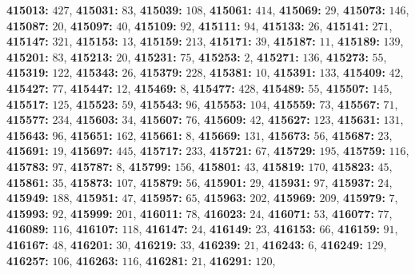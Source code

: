 \textsf{\bfseries 415013:} $427$, \textsf{\bfseries 415031:} $83$, \textsf{\bfseries 415039:} $108$, \textsf{\bfseries 415061:} $414$, \textsf{\bfseries 415069:} $29$, \textsf{\bfseries 415073:} $146$, \textsf{\bfseries 415087:} $20$, \textsf{\bfseries 415097:} $40$, \textsf{\bfseries 415109:} $92$, \textsf{\bfseries 415111:} $94$, \textsf{\bfseries 415133:} $26$, \textsf{\bfseries 415141:} $271$, \textsf{\bfseries 415147:} $321$, \textsf{\bfseries 415153:} $13$, \textsf{\bfseries 415159:} $213$, \textsf{\bfseries 415171:} $39$, \textsf{\bfseries 415187:} $11$, \textsf{\bfseries 415189:} $139$, \textsf{\bfseries 415201:} $83$, \textsf{\bfseries 415213:} $20$, \textsf{\bfseries 415231:} $75$, \textsf{\bfseries 415253:} $2$, \textsf{\bfseries 415271:} $136$, \textsf{\bfseries 415273:} $55$, \textsf{\bfseries 415319:} $122$, \textsf{\bfseries 415343:} $26$, \textsf{\bfseries 415379:} $228$, \textsf{\bfseries 415381:} $10$, \textsf{\bfseries 415391:} $133$, \textsf{\bfseries 415409:} $42$, \textsf{\bfseries 415427:} $77$, \textsf{\bfseries 415447:} $12$, \textsf{\bfseries 415469:} $8$, \textsf{\bfseries 415477:} $428$, \textsf{\bfseries 415489:} $55$, \textsf{\bfseries 415507:} $145$, \textsf{\bfseries 415517:} $125$, \textsf{\bfseries 415523:} $59$, \textsf{\bfseries 415543:} $96$, \textsf{\bfseries 415553:} $104$, \textsf{\bfseries 415559:} $73$, \textsf{\bfseries 415567:} $71$, \textsf{\bfseries 415577:} $234$, \textsf{\bfseries 415603:} $34$, \textsf{\bfseries 415607:} $76$, \textsf{\bfseries 415609:} $42$, \textsf{\bfseries 415627:} $123$, \textsf{\bfseries 415631:} $131$, \textsf{\bfseries 415643:} $96$, \textsf{\bfseries 415651:} $162$, \textsf{\bfseries 415661:} $8$, \textsf{\bfseries 415669:} $131$, \textsf{\bfseries 415673:} $56$, \textsf{\bfseries 415687:} $23$, \textsf{\bfseries 415691:} $19$, \textsf{\bfseries 415697:} $445$, \textsf{\bfseries 415717:} $233$, \textsf{\bfseries 415721:} $67$, \textsf{\bfseries 415729:} $195$, \textsf{\bfseries 415759:} $116$, \textsf{\bfseries 415783:} $97$, \textsf{\bfseries 415787:} $8$, \textsf{\bfseries 415799:} $156$, \textsf{\bfseries 415801:} $43$, \textsf{\bfseries 415819:} $170$, \textsf{\bfseries 415823:} $45$, \textsf{\bfseries 415861:} $35$, \textsf{\bfseries 415873:} $107$, \textsf{\bfseries 415879:} $56$, \textsf{\bfseries 415901:} $29$, \textsf{\bfseries 415931:} $97$, \textsf{\bfseries 415937:} $24$, \textsf{\bfseries 415949:} $188$, \textsf{\bfseries 415951:} $47$, \textsf{\bfseries 415957:} $65$, \textsf{\bfseries 415963:} $202$, \textsf{\bfseries 415969:} $209$, \textsf{\bfseries 415979:} $7$, \textsf{\bfseries 415993:} $92$, \textsf{\bfseries 415999:} $201$, \textsf{\bfseries 416011:} $78$, \textsf{\bfseries 416023:} $24$, \textsf{\bfseries 416071:} $53$, \textsf{\bfseries 416077:} $77$, \textsf{\bfseries 416089:} $116$, \textsf{\bfseries 416107:} $118$, \textsf{\bfseries 416147:} $24$, \textsf{\bfseries 416149:} $23$, \textsf{\bfseries 416153:} $66$, \textsf{\bfseries 416159:} $91$, \textsf{\bfseries 416167:} $48$, \textsf{\bfseries 416201:} $30$, \textsf{\bfseries 416219:} $33$, \textsf{\bfseries 416239:} $21$, \textsf{\bfseries 416243:} $6$, \textsf{\bfseries 416249:} $129$, \textsf{\bfseries 416257:} $106$, \textsf{\bfseries 416263:} $116$, \textsf{\bfseries 416281:} $21$, \textsf{\bfseries 416291:} $120$, 
